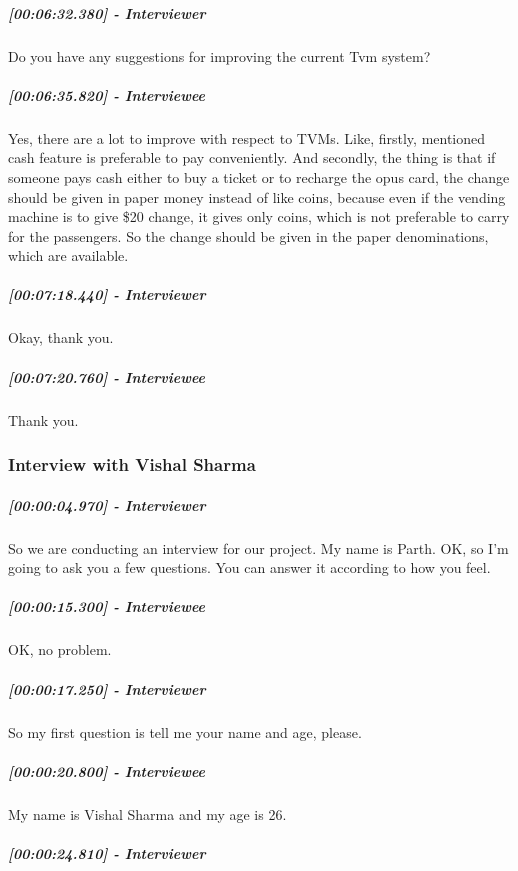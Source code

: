 \documentclass[a4paper,12pt]{article}
\begin{document}
\hypertarget{interviewer-47}{%
\subparagraph{{[}00:06:32.380{]} - Interviewer}\label{interviewer-47}}

Do you have any suggestions for improving the current Tvm system?

\hypertarget{interviewee-31}{%
\subparagraph{{[}00:06:35.820{]} - Interviewee}\label{interviewee-31}}

Yes, there are a lot to improve with respect to TVMs. Like, firstly,
mentioned cash feature is preferable to pay conveniently. And secondly,
the thing is that if someone pays cash either to buy a ticket or to
recharge the opus card, the change should be given in paper money
instead of like coins, because even if the vending machine is to give
\$20 change, it gives only coins, which is not preferable to carry for
the passengers. So the change should be given in the paper
denominations, which are available.

\hypertarget{interviewer-48}{%
\subparagraph{{[}00:07:18.440{]} - Interviewer}\label{interviewer-48}}

Okay, thank you.

\hypertarget{interviewee-32}{%
\subparagraph{{[}00:07:20.760{]} - Interviewee}\label{interviewee-32}}

Thank you.

\newpage
\subsubsection{Interview with Vishal Sharma}
\hypertarget{interviewer}{%
\subparagraph{{[}00:00:04.970{]} - Interviewer}\label{interviewer}}

So we are conducting an interview for our project. My name is Parth. OK,
so I'm going to ask you a few questions. You can answer it according to
how you feel.

\hypertarget{interviewee}{%
\subparagraph{{[}00:00:15.300{]} - Interviewee}\label{interviewee}}

OK, no problem.

\hypertarget{interviewer-1}{%
\subparagraph{{[}00:00:17.250{]} - Interviewer}\label{interviewer-1}}

So my first question is tell me your name and age, please.

\hypertarget{interviewee-1}{%
\subparagraph{{[}00:00:20.800{]} - Interviewee}\label{interviewee-1}}

My name is Vishal Sharma and my age is 26.

\hypertarget{interviewer-2}{%
\subparagraph{{[}00:00:24.810{]} - Interviewer}\label{interviewer-2}}
\end{document}
